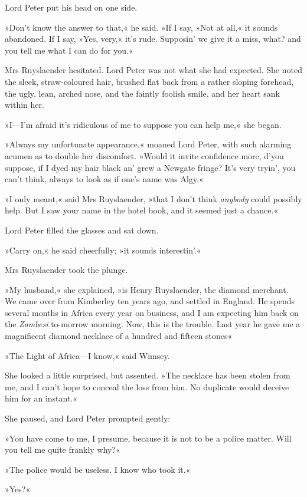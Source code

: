 Lord Peter put his head on one side.

»Don't know the answer to that,« he said. »If I say, »Not at all,« it sounds abandoned. If I say, »Yes, very,« it's rude. Supposin' we give it a miss, what? and you tell me what I can do for you.«

Mrs Ruyslaender hesitated. Lord Peter was not what she had expected. She noted the sleek, straw-coloured hair, brushed flat back from a rather sloping forehead, the ugly, lean, arched nose, and the faintly foolish smile, and her heart sank within her.

»I—I'm afraid it's ridiculous of me to suppose you can help me,« she began.

»Always my unfortunate appearance,« moaned Lord Peter, with such alarming acumen as to double her discomfort. »Would it invite confidence more, d'you suppose, if I dyed my hair black an' grew a Newgate fringe? It's very tryin', you can't think, always to look as if one's name was Algy.«

»I only meant,« said Mrs Ruyslaender, »that I don't think \textit{anybody} could possibly help. But I saw your name in the hotel book, and it seemed just a chance.«

Lord Peter filled the glasses and sat down.

»Carry on,« he said cheerfully; »it sounds interestin'.«

Mrs Ruyslaender took the plunge.

»My husband,« she explained, »is Henry Ruyslaender, the diamond merchant. We came over from Kimberley ten years ago, and settled in England. He spends several months in Africa every year on business, and I am expecting him back on the \textit{Zambesi} to-morrow morning. Now, this is the trouble. Last year he gave me a magnificent diamond necklace of a hundred and fifteen stones\longdash«

»The Light of Africa—I know,« said Wimsey.

She looked a little surprised, but assented. »The necklace has been stolen from me, and I can't hope to conceal the loss from him. No duplicate would deceive him for an instant.«

She paused, and Lord Peter prompted gently:

»You have come to me, I presume, because it is not to be a police matter. Will you tell me quite frankly why?«

»The police would be useless. I know who took it.«

»Yes?«

